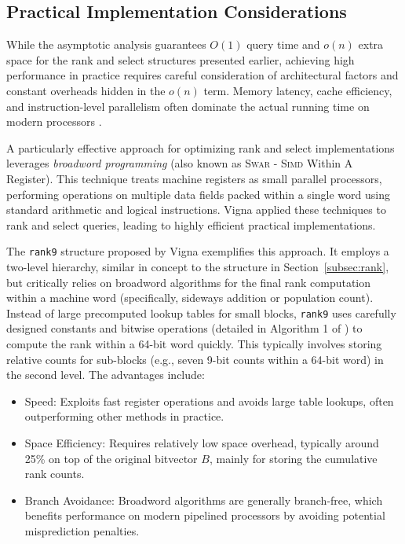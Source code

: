 \subsection{Practical Implementation Considerations} \label{subsec:practical_considerations}

While the asymptotic analysis guarantees $O(1)$ query time and $o(n)$ extra space for the rank and select structures presented earlier, achieving high performance in practice requires careful consideration of architectural factors and constant overheads hidden in the $o(n)$ term. Memory latency, cache efficiency, and instruction-level parallelism often dominate the actual running time on modern processors \cite{ferragina2023pearls}.

A particularly effective approach for optimizing rank and select implementations leverages \emph{broadword programming} (also known as \textsc{Swar} - \textsc{Simd} Within A Register). This technique treats machine registers as small parallel processors, performing operations on multiple data fields packed within a single word using standard arithmetic and logical instructions. Vigna \cite{vigna2008broadword} applied these techniques to rank and select queries, leading to highly efficient practical implementations.

The \texttt{rank9} structure proposed by Vigna \cite{vigna2008broadword} exemplifies this approach. It employs a two-level hierarchy, similar in concept to the structure in Section~\ref{subsec:rank}, but critically relies on broadword algorithms for the final rank computation within a machine word (specifically, sideways addition or population count). Instead of large precomputed lookup tables for small blocks, \texttt{rank9} uses carefully designed constants and bitwise operations (detailed in Algorithm 1 of \cite{vigna2008broadword}) to compute the rank within a 64-bit word quickly. This typically involves storing relative counts for sub-blocks (e.g., seven 9-bit counts within a 64-bit word) in the second level. The advantages include:
\begin{itemize}
    \item Speed: Exploits fast register operations and avoids large table lookups, often outperforming other methods in practice.
    \item Space Efficiency: Requires relatively low space overhead, typically around 25\% on top of the original bitvector $B$, mainly for storing the cumulative rank counts.
    \item Branch Avoidance: Broadword algorithms are generally branch-free, which benefits performance on modern pipelined processors by avoiding potential misprediction penalties.
\end{itemize}

